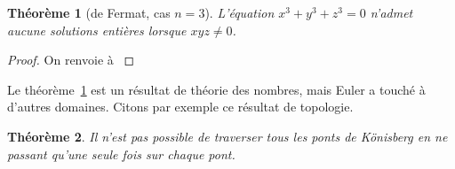 \documentclass[fleqn,leqno]{article}%
\theoremstyle{plain}
\newtheorem{theoreme}{Théorème}[section]
\theoremstyle{definition}
\theoremstyle{remark}
\numberwithin{equation}{section}
\begin{document}
\begin{theoreme}[de Fermat, cas $n=3$]\label{theoreme.I}
L'équation $x^3 + y^3 + z^3 = 0$ n'admet aucune solutions entières lorsque $xyz \neq 0$.
\end{theoreme}

\begin{proof}
On renvoie à \cite{ref1}
\end{proof}

Le théorème~\ref{theoreme.I} est un résultat de théorie des nombres, mais Euler a touché à d'autres domaines. Citons par exemple ce résultat de topologie.

\begin{theoreme}
Il n'est pas possible de traverser tous les ponts de Könisberg en ne passant qu'une seule fois sur chaque pont.
\end{theoreme}


 
\nocite{*}

 


\end{document}
